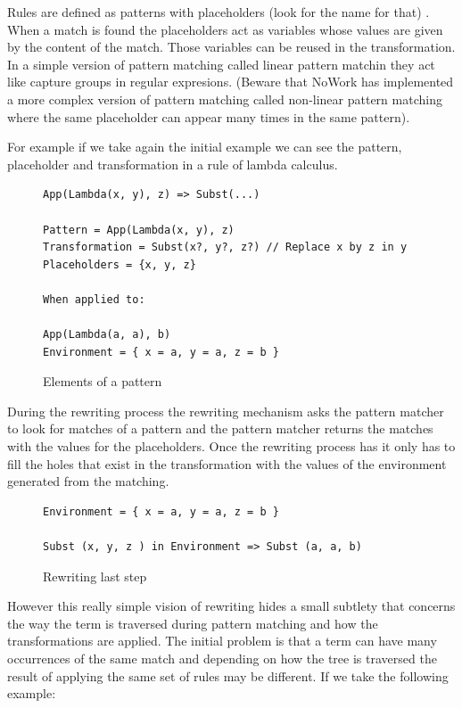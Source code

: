 \documentclass[12pt,a4paper]{article}
\begin{document}
Rules are defined as patterns with placeholders (look for the name for
that) . When a match is found the placeholders act as variables whose
values are given by the content of the match. Those variables can be
reused in the transformation. In a simple version of pattern matching
called linear pattern matchin they act like capture groups in regular
expresions. (Beware that NoWork has implemented a more complex version of
pattern matching called non-linear pattern matching where the same
placeholder can appear many times in the same pattern).

For example if we take again the initial example we can see the
pattern, placeholder and transformation in a rule of lambda calculus.

\begin{figure}
\begin{verbatim}
App(Lambda(x, y), z) => Subst(...)

Pattern = App(Lambda(x, y), z)
Transformation = Subst(x?, y?, z?) // Replace x by z in y
Placeholders = {x, y, z}

When applied to:

App(Lambda(a, a), b)
Environment = { x = a, y = a, z = b }

\end{verbatim}
\caption{Elements of a pattern}
\end{figure}

During the rewriting process the rewriting mechanism asks the pattern
matcher to look for matches of a pattern and the pattern matcher
returns the matches with the values for the placeholders. Once the
rewriting process has it only has to fill the holes that exist in the
transformation with the values of the environment generated from the
matching.


\begin{figure}
\begin{verbatim}
Environment = { x = a, y = a, z = b }

Subst (x, y, z ) in Environment => Subst (a, a, b) 

\end{verbatim}
\caption{Rewriting last step}
\end{figure}

However this really simple vision of rewriting hides a small subtlety
that concerns the way the term is traversed during pattern matching
and how the transformations are applied. The initial problem is that
a term can have many occurrences of the same match and depending on
how the tree is traversed the result of applying the same set of rules
may be different. If we take the following example:
\end{document}
